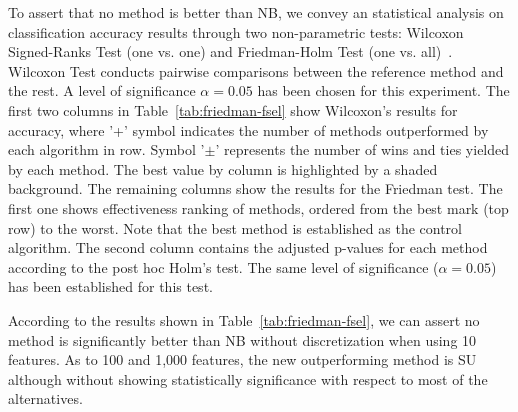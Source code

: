 \documentclass[preprint,12pt]{elsarticle}
\begin{document}
\begin{itemize}
To assert that no method is better than NB, we convey an statistical analysis on classification accuracy results through two non-parametric tests: Wilcoxon Signed-Ranks Test (one vs. one) and Friedman-Holm Test (one vs. all)~\cite{garcia09, derrac11}. Wilcoxon Test conducts pairwise comparisons between the reference method and the rest. A level of significance $\alpha = 0.05$ has been chosen for this experiment. The first two columns in Table~\ref{tab:friedman-fsel} show Wilcoxon's results for accuracy, where '+' symbol indicates the number of methods outperformed by each algorithm in row. Symbol '$\pm$' represents the number of wins and ties yielded by each method. The best value by column is highlighted by a shaded background. The remaining columns show the results for the Friedman test. The first one shows effectiveness ranking of methods, ordered from the best mark (top row) to the worst. Note that the best method is established as the control algorithm. The second column contains the adjusted p-values for each method according to the post hoc Holm's test. The same level of significance ($\alpha = 0.05$) has been established for this test.

According to the results shown in Table~\ref{tab:friedman-fsel}, we can assert no method is significantly better than NB without discretization when using 10 features. As to 100 and 1,000 features, the new outperforming method is SU although without showing statistically significance with respect to most of the alternatives.



\end{itemize}
\end{document}
